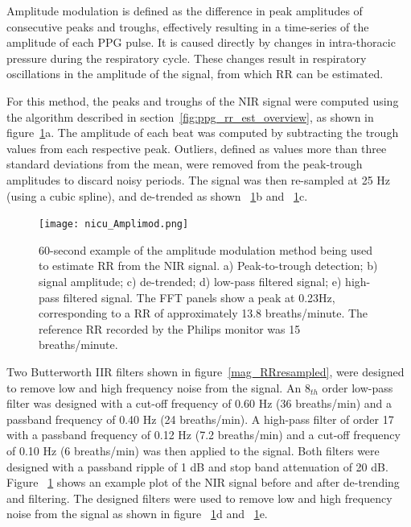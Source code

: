 Amplitude modulation is defined as the difference in peak amplitudes of consecutive peaks and troughs, effectively resulting in a time-series of the amplitude of each PPG pulse.
It is caused directly by changes in intra-thoracic pressure during the respiratory cycle. These changes result in respiratory oscillations in the amplitude of the signal, from which RR can be estimated. 

For this method, the peaks and troughs of the NIR signal were computed using the algorithm described in section~\ref{fig:ppg_rr_est_overview}, as shown in figure~\ref{amplimod}a. The amplitude of each beat was computed by subtracting the trough values from each respective peak. Outliers, defined as values more than three standard deviations from the mean, were removed from the peak-trough amplitudes to discard noisy periods. The signal was then re-sampled at 25 Hz (using a cubic spline), and de-trended as shown ~\ref{amplimod}b and ~\ref{amplimod}c. 


\begin{figure}
    \centering
\texttt{[image: nicu\_Amplimod.png]}
    \caption[60-second example of the amplitude modulation method being used to estimate RR from the NIR signal.]{60-second example of the amplitude modulation method being used to estimate RR from the NIR signal. a) Peak-to-trough detection; b) signal amplitude; c) de-trended; d) low-pass filtered signal; e) high-pass filtered signal. The FFT panels show a peak at 0.23Hz, corresponding to a RR of approximately 13.8 breaths/minute. The reference RR recorded by the Philips monitor was 15 breaths/minute.}
    \label{amplimod} 
\end{figure}


Two Butterworth IIR filters shown in figure~\ref{mag_RRresampled}, were designed to remove low and high frequency noise from the signal. An $8_{th}$ order low-pass filter was designed with a cut-off frequency of 0.60 Hz (36 breaths/min) and a passband frequency of 0.40 Hz (24 breaths/min). A high-pass filter of order 17 with a passband frequency of 0.12 Hz (7.2 breaths/min) and a cut-off frequency of 0.10 Hz (6 breaths/min) was then applied to the signal. Both filters were designed with a passband ripple of 1 dB and stop band attenuation of 20 dB. Figure ~\ref{amplimod} shows an example plot of the NIR signal before and after de-trending and filtering. The designed filters were used to remove low and high frequency noise from the signal as shown in figure ~\ref{amplimod}d and ~\ref{amplimod}e. 



